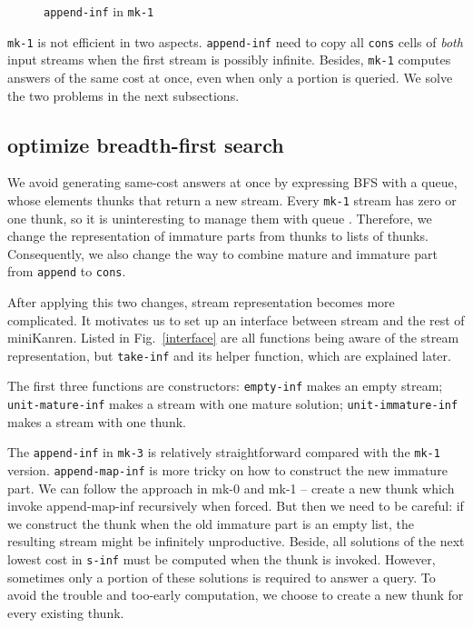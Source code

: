 \documentclass[format=acmlarge, review=true, authordraft=true]{acmart}
\begin{document}
\begin{figure}
	 	
	 \caption{\texttt{append-inf} in \texttt{mk-1}}
	 \label{append-inf-1}
\end{figure}

\texttt{mk-1} is not efficient in two aspects. \texttt{append-inf} need to copy 
all \texttt{cons} cells of \emph{both} input streams when the first stream is 
possibly infinite. Besides, \texttt{mk-1} computes answers of the same cost
at once, even when only a portion is queried. We solve the two problems in the 
next subsections.

\subsection{optimize breadth-first search}

We avoid generating same-cost answers at once by expressing BFS with a queue, 
whose elements thunks that return a new stream. Every \texttt{mk-1} stream has 
zero or one thunk, so it is uninteresting to manage them with queue . Therefore, 
we change the representation of immature parts from thunks to 
lists of thunks. Consequently, we also change the way to combine mature and 
immature part from \texttt{append} to \texttt{cons}. 

After applying this two changes, stream representation becomes more 
complicated. It motivates us to set up an interface between stream 
and the rest of miniKanren. Listed in Fig.~\ref{interface} are all functions 
being aware of the stream representation, but \texttt{take-inf} and its helper 
function, which are explained later. 

The first three functions are constructors: \texttt{empty-inf} makes an 
empty stream; \texttt{unit-mature-inf} makes a stream with one mature 
solution; \texttt{unit-immature-inf} makes a stream with one thunk. 

The \texttt{append-inf} in \texttt{mk-3} is relatively straightforward compared 
with the \texttt{mk-1} version. \texttt{append-map-inf} is more tricky on how to 
construct the new immature part. We can follow the approach in mk-0 and mk-1 -- 
create a new thunk which invoke append-map-inf recursively when forced. But then 
we need to be careful: if we construct the thunk when the old immature part is 
an empty list, the resulting stream might be infinitely unproductive. Beside, 
all solutions of the next lowest cost in \texttt{s-inf} must be computed when 
the thunk is invoked. However, sometimes only a portion of these solutions is 
required to answer a query. To avoid the trouble and too-early computation, 
we choose to create a new thunk for every existing thunk. 
\end{document}
